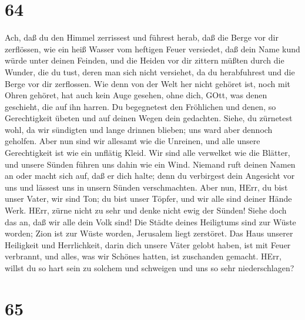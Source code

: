 \hypertarget{section-63}{%
\section{64}\label{section-63}}

 Ach, daß du den Himmel zerrissest und führest herab, daß
die Berge vor dir zerflössen,  wie ein heiß Wasser vom
heftigen Feuer versiedet, daß dein Name kund würde unter deinen Feinden,
und die Heiden vor dir zittern müßten  durch die Wunder, die
du tust, deren man sich nicht versiehet, da du herabfuhrest und die
Berge vor dir zerflossen.  Wie denn von der Welt her nicht
gehöret ist, noch mit Ohren gehöret, hat auch kein Auge gesehen, ohne
dich, GOtt, was denen geschieht, die auf ihn harren.  Du
begegnetest den Fröhlichen und denen, so Gerechtigkeit übeten und auf
deinen Wegen dein gedachten. Siehe, du zürnetest wohl, da wir sündigten
und lange drinnen blieben; uns ward aber dennoch geholfen. 
Aber nun sind wir allesamt wie die Unreinen, und alle unsere
Gerechtigkeit ist wie ein unflätig Kleid. Wir sind alle verwelket wie
die Blätter, und unsere Sünden führen uns dahin wie ein Wind.
 Niemand ruft deinen Namen an oder macht sich auf, daß er
dich halte; denn du verbirgest dein Angesicht vor uns und lässest uns in
unsern Sünden verschmachten.  Aber nun, HErr, du bist unser
Vater, wir sind Ton; du bist unser Töpfer, und wir alle sind deiner
Hände Werk.  HErr, zürne nicht zu sehr und denke nicht ewig
der Sünden! Siehe doch das an, daß wir alle dein Volk sind!
 Die Städte deines Heiligtums sind zur Wüste worden; Zion
ist zur Wüste worden, Jerusalem liegt zerstöret.  Das Haus
unserer Heiligkeit und Herrlichkeit, darin dich unsere Väter gelobt
haben, ist mit Feuer verbrannt, und alles, was wir Schönes hatten, ist
zuschanden gemacht.  HErr, willst du so hart sein zu
solchem und schweigen und uns so sehr niederschlagen?

\hypertarget{section-64}{%
\section{65}\label{section-64}}

